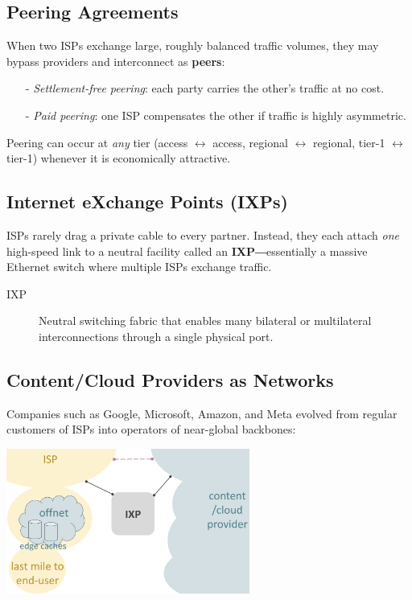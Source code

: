 \documentclass[../../compsys.tex]{subfiles}
\begin{document}
\subsection{Peering Agreements}\label{subsec:peering}
When two ISPs exchange large, roughly balanced traffic volumes, they may
bypass providers and interconnect as \textbf{peers}:

\begin{itemize}
  \item[-] \emph{Settlement-free peering}: each party carries the other's
        traffic at no cost.
  \item[-] \emph{Paid peering}: one ISP compensates the other if traffic
        is highly asymmetric.
\end{itemize}

Peering can occur at \emph{any} tier (access $\leftrightarrow$ access, regional $\leftrightarrow$
regional, tier-1  $\leftrightarrow$ tier-1) whenever it is economically attractive.

\subsection{Internet eXchange Points (IXPs)}\label{subsec:ixp}
ISPs rarely drag a private cable to every partner.  
Instead, they each attach \emph{one} high-speed link to a neutral
facility called an \textbf{IXP}―essentially a massive Ethernet switch
where multiple ISPs exchange traffic.

\begin{description}
  \item[IXP] Neutral switching fabric that enables many bilateral or
        multilateral interconnections through a single physical port.
\end{description}

\subsection{Content/Cloud Providers as Networks}\label{subsec:ccp}
Companies such as Google, Microsoft, Amazon, and Meta evolved from
regular customers of ISPs into operators of near-global backbones:

\begin{center}
    \includegraphics[width=0.60\textwidth]{images/ixp-ccp-edge.png}
  \end{center}
\end{document}
